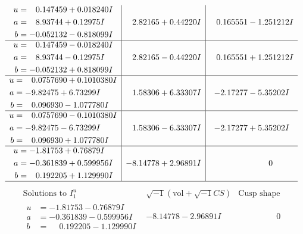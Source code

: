 \documentclass[1p]{elsarticle_modified}
\theoremstyle{definition}
\newcommand{\I}{\sqrt{-1}}
\begin{document}
$$\begin{array}{c|c|c}
\begin{aligned}
u &= \phantom{-}0.147459 + 0.018240 I \\
a &= \phantom{-}8.93744 + 0.12975 I \\
b &= -0.052132 - 0.818099 I\end{aligned}
 & \phantom{-}2.82165 + 0.44220 I & \phantom{-}0.165551 - 1.251212 I \\ \hline\begin{aligned}
u &= \phantom{-}0.147459 - 0.018240 I \\
a &= \phantom{-}8.93744 - 0.12975 I \\
b &= -0.052132 + 0.818099 I\end{aligned}
 & \phantom{-}2.82165 - 0.44220 I & \phantom{-}0.165551 + 1.251212 I \\ \hline\begin{aligned}
u &= \phantom{-}0.0757690 + 0.1010380 I \\
a &= -9.82475 + 6.73299 I \\
b &= \phantom{-}0.096930 - 1.077780 I\end{aligned}
 & \phantom{-}1.58306 + 6.33307 I & -2.17277 - 5.35202 I \\ \hline\begin{aligned}
u &= \phantom{-}0.0757690 - 0.1010380 I \\
a &= -9.82475 - 6.73299 I \\
b &= \phantom{-}0.096930 + 1.077780 I\end{aligned}
 & \phantom{-}1.58306 - 6.33307 I & -2.17277 + 5.35202 I \\ \hline\begin{aligned}
u &= -1.81753 + 0.76879 I \\
a &= -0.361839 + 0.599956 I \\
b &= \phantom{-}0.192205 + 1.129990 I\end{aligned}
 & -8.14778 + 2.96891 I & \phantom{-0.000000 } 0\\
 \hline 
 \end{array}$$\newpage$$\begin{array}{c|c|c}  
\text{Solutions to }I^u_{1}& \I (\text{vol} + \sqrt{-1}CS) & \text{Cusp shape}\\
 \hline 
\begin{aligned}
u &= -1.81753 - 0.76879 I \\
a &= -0.361839 - 0.599956 I \\
b &= \phantom{-}0.192205 - 1.129990 I\end{aligned}
 & -8.14778 - 2.96891 I & \phantom{-0.000000 } 0 \\ \hline\begin{aligned}

\end{aligned}
\end{array}$$
\end{document}
